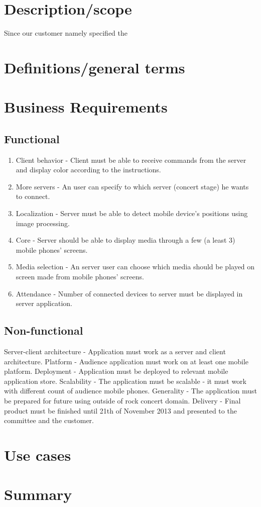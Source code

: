 \section{Description/scope}


Since our customer namely specified the 
\section{Definitions/general terms}
\section{Business Requirements}
\subsection{Functional}

\begin{enumerate}
\item Client behavior - Client must be able to receive commands from the server and display color according to the instructions.
\item More servers - An user can specify to which server (concert stage) he wants to connect.
\item Localization - Server must be able to detect mobile device's positions using image processing.
\item Core - Server should be able to display media through a few (a least 3) mobile phones' screens.
\item Media selection - An server user can choose which media should be played on screen made from mobile phones' screens.
\item Attendance - Number of connected devices to server must be displayed in server application.
\end{enumerate}

\subsection{Non-functional}
Server-client architecture - Application must work as a server and client architecture.
Platform - Audience application must work on at least one mobile platform.
Deployment - Application must be deployed to relevant mobile application store.
Scalability - The application must be scalable - it must work with different count of audience mobile phones.
Generality - The application must be prepared for future using outside of rock concert domain.
Delivery - Final product must be finished until 21th of November 2013 and presented to the committee and the customer.
\section{Use cases}
\section{Summary}
